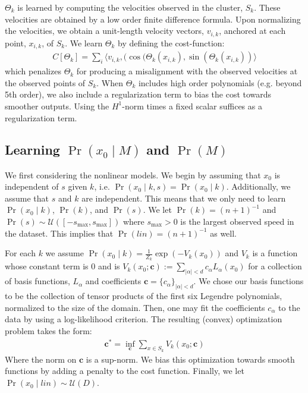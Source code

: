 \documentclass[letterpaper,10pt,conference]{ieeeconf}
\begin{document}
 $\Theta_k$ is learned by computing the velocities observed in the cluster, $S_k$.
  These velocities are obtained by a low order finite difference formula.
  Upon normalizing the velocities, we obtain a unit-length velocity vectors, $v_{i,k}$, anchored at each point, $x_{i,k}$, of $S_k$.
  We learn $\Theta_k$ by defining the cost-function:
  \begin{align}
  	C[ \Theta_k] = \sum_i \langle v_{i,k} , ( \cos(\Theta_k( x_{i,k}) , \sin( \Theta_k( x_{i,k} ) ) \rangle
  \end{align}
  which penalizes $\Theta_k$ for producing a misalignment with the observed velocities at the observed points of $S_k$.
  When $\Theta_{k}$ includes high order polynomials (e.g. beyond 5th order), we also include a regularization term to bias the cost towards smoother outputs.
  Using the $H^1$-norm times a fixed scalar suffices as a regularization term. 
  
  \subsection{Learning $\Pr( x_0 \mid M)$ and $\Pr(M)$}
  
We first considering the nonlinear models.
  We begin by assuming that $x_0$ is independent of $s$ given $k$, i.e. $\Pr( x_0 \mid k,s) = \Pr(x_0 \mid k)$.
  Additionally, we assume that $s$ and $k$ are independent.
  This means that we only need to learn $\Pr( x_0 \mid k)$, $\Pr(k)$, and $\Pr(s)$.
  We let $\Pr(k) = (n+1)^{-1}$ and $\Pr(s) \sim \mathcal{U}( [-s_{\max}, s_{\max} ] )$  where $s_{\max}>0$ is the largest observed speed in the dataset.  
  This implies that $\Pr(lin) = (n+1)^{-1}$ as well.
  
  For each $k$ we assume $\Pr( x_0 \mid k) = \frac{1}{Z_k} \exp( - V_k(x_0) )$ and $V_k$ is a function whose constant term is $0$ and is  $V_k(x_0; \mathbf{c} ) := \sum_{|\alpha|< d} c_{\alpha} L_{\alpha}( x_0)$ for a collection of basis functions, $L_{\alpha}$ and coefficients $\mathbf{c} = \{ c_{\alpha} \}_{|\alpha| < d}$.
  We chose our basis functions to be the collection of tensor products of the first six Legendre polynomials, normalized to the size of the domain.
  Then, one may fit the coefficients $c_{\alpha}$ to the data by using a log-likelihood criterion.
  The resulting (convex) optimization problem takes the form:
  \begin{align}
  	\mathbf{c}^* = \inf_{ \mathbf{c} } \sum_{x \in S_k} V_k( x_0; \mathbf{c})
  \end{align}
  Where the norm on $\mathbf{c}$ is a sup-norm.
  We bias this optimization towards smooth functions by adding a penalty to the cost function.
    Finally, we let $\Pr( x_0 \mid lin) \sim \mathcal{U}(D)$.
  
\end{document}
